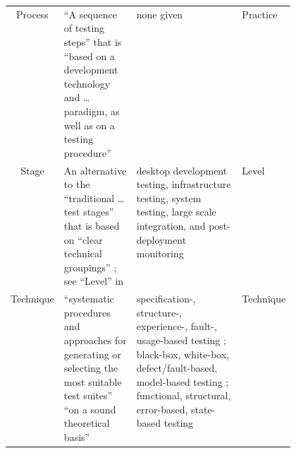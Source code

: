\begin{table}[hbtp!]
\begin{tabularx}{\linewidth}{|c|X|m{0.37\linewidth}|m{0.1\linewidth}|}
        Process                            & ``A sequence of
        testing steps'' \citep[p.~2]{BarbosaEtAl2006} that
        is ``based on a development technology and \dots
        paradigm, as well as on a testing procedure''
        \citep[p.~3]{BarbosaEtAl2006}      & none given         & Practice                               \\
        Stage                              & An
        alternative to the ``traditional \dots test stages'' that is based on
        ``clear technical groupings'' \citep[p.~13]{Gerrard2000}; see ``Level'' in
        \nameref{tab:ieeeTestTerms}        & desktop
        development testing, infrastructure testing, system testing,
        large scale integration, and post-deployment monitoring
        \citep[p.~13]{Gerrard2000}         & Level                                                       \\
        Technique                          & ``systematic
        procedures and approaches for generating or selecting the most suitable test
        suites'' \citep[p.~5-10]{SWEBOK2024} ``on a sound theoretical basis''
        \citep[p.~3]{BarbosaEtAl2006}      & specification-,
        structure-, experience-, fault-, usage-based testing \citep[pp.~5-10, 5-13 to 5-15]{SWEBOK2024};
        black-box, white-box, defect/fault-based, model-based testing \citep[p.~3]{SouzaEtAl2017};
        functional, structural, error-based, state-based testing
        \citep[p.~3]{BarbosaEtAl2006}
                                           & Technique                                                   \\
        \hline
    \end{tabularx}
\end{table}

